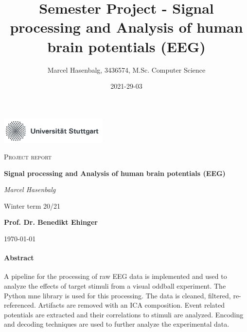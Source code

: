 \documentclass[a4paper]{article}
\title{Semester Project - Signal processing and Analysis of human brain potentials (EEG)}
\date{2021-29-03}
\author{Marcel Hasenbalg, 3436574, M.Sc. Computer Science}
\begin{document}
%
%

\begin{titlepage}
	\centering
	\includegraphics[width=0.4\textwidth]{uni_stgt.png}\par\vspace{1cm}
	{\scshape\LARGE Project report \par}
	\vspace{1.5cm}
	{\huge\bfseries Signal processing and Analysis of human brain potentials (EEG)\par}
	\vspace{2cm}
	{\Large\itshape Marcel Hasenbalg\par}
	\vfill
	Winter term 20/21\par
	\textbf{Prof. Dr. Benedikt Ehinger}
	\vfill
	\vfill

	{\large \today\par}
\end{titlepage}


\newpage
{}
\tableofcontents
\newpage

\paragraph{Abstract}
A pipeline for the processing of raw EEG data is implemented and used to analyze the effects of target stimuli from a visual oddball experiment.
The Python mne library is used for this processing.
The data is cleaned, filtered, re-referenced.
Artifacts are removed with an ICA composition.
Event related potentials are extracted and their correlations to stimuli are analyzed.
Encoding and decoding techniques are used to further analyze the experimental data.
\end{document}
